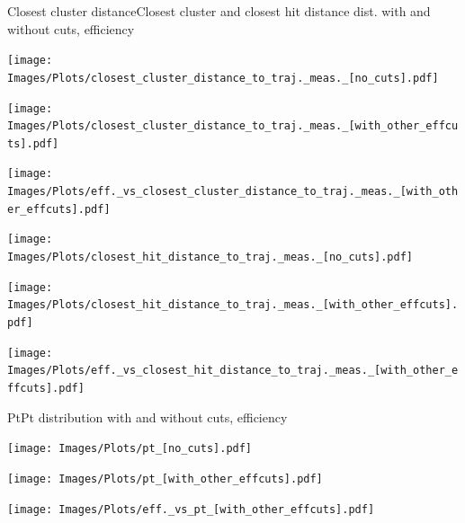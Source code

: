\documentclass{beamer}
\begin{document}
\begin{frame}{Closest cluster distance}{Closest cluster and closest hit distance dist. with and without cuts, efficiency}
  \begin{minipage}{0.32\textwidth}
    \centering
    \texttt{[image: Images/Plots/closest\_cluster\_distance\_to\_traj.\_meas.\_[no\_cuts].pdf]}
  \end{minipage}%
  \hspace{0.01\textwidth}%
  \begin{minipage}{0.32\textwidth}
    \centering
    \texttt{[image: Images/Plots/closest\_cluster\_distance\_to\_traj.\_meas.\_[with\_other\_effcuts].pdf]}
  \end{minipage}%
  \hspace{0.01\textwidth}%
  \begin{minipage}{0.32\textwidth}
    \centering
    \texttt{[image: Images/Plots/eff.\_vs\_closest\_cluster\_distance\_to\_traj.\_meas.\_[with\_other\_effcuts].pdf]}
  \end{minipage}
  \vspace*{0.2cm}
  \begin{minipage}{0.32\textwidth}
    \centering
    \texttt{[image: Images/Plots/closest\_hit\_distance\_to\_traj.\_meas.\_[no\_cuts].pdf]}
  \end{minipage}%
  \hspace{0.01\textwidth}%
  \begin{minipage}{0.32\textwidth}
    \centering
    \texttt{[image: Images/Plots/closest\_hit\_distance\_to\_traj.\_meas.\_[with\_other\_effcuts].pdf]}
  \end{minipage}%
  \hspace{0.01\textwidth}%
  \begin{minipage}{0.32\textwidth}
    \centering
    \texttt{[image: Images/Plots/eff.\_vs\_closest\_hit\_distance\_to\_traj.\_meas.\_[with\_other\_effcuts].pdf]}
  \end{minipage}
\end{frame}

\begin{frame}{Pt}{Pt distribution with and without cuts, efficiency}
    \centering
  \begin{minipage}{0.35\textwidth}
    \centering
    \texttt{[image: Images/Plots/pt\_[no\_cuts].pdf]}
  \end{minipage}%
  \hspace{0.01\textwidth}%
  \vspace*{0.4cm}
  \begin{minipage}{0.35\textwidth}
    \centering
    \texttt{[image: Images/Plots/pt\_[with\_other\_effcuts].pdf]}
  \end{minipage}%
  \hspace{0.01\textwidth}%
  \begin{minipage}{0.35\textwidth}
    \centering
    \texttt{[image: Images/Plots/eff.\_vs\_pt\_[with\_other\_effcuts].pdf]}
  \end{minipage}
\end{frame}
\end{document}

